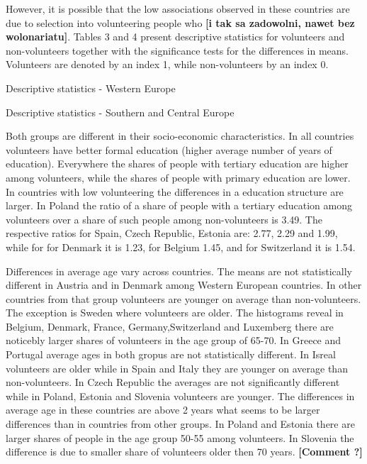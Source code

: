 \documentclass[10pt, letterpaper]{article}
\begin{document}
\begin{spacing}{1.4}
However, it is possible that the low associations observed in these countries are due to selection into volunteering people who \textbf{[i tak sa zadowolni, nawet bez wolonariatu]}. Tables 3 and 4 present descriptive statistics for volunteers and non-volunteers together with the significance tests for the differences in means. Volunteers are denoted by an index 1, while non-volunteers by an index 0.  \\


\begin{table}[H]
\begin{spacing}{.9}  
\centering 
 \caption{Descriptive statistics - Western Europe}
	 
      \label{DescT0WE} 

\end{spacing}
\end{table}


\begin{table}[H]
\begin{spacing}{.9}  
\centering 
 \caption{Descriptive statistics - Southern and Central Europe}
	 
      \label{DescT0CEE} 

\end{spacing}
\end{table}
Both groups are different in their socio-economic characteristics. In all countries volunteers have better formal education (higher average number of years of education). Everywhere the shares of people with tertiary education are higher among volunteers, while the shares of people with primary education are lower. In countries with low volunteering the differences in a education structure are larger. In Poland the ratio of a share of people with a tertiary  education among volunteers over a share of such people among non-volunteers is 3.49. The respective ratios for Spain, Czech Republic, Estonia are: 2.77, 2.29 and 1.99, while for for Denmark it is 1.23, for Belgium 1.45, and for Switzerland it is 1.54. 

Differences in average age vary across countries. The means are  not statistically different  in Austria and in Denmark among Western European countries. In other countries from that group volunteers are younger  on average than non-volunteers. The exception is Sweden where volunteers are older. The histograms reveal in Belgium, Denmark, France, Germany,Switzerland and Luxemberg there are noticebly larger shares of volunteers in the age group of 65-70. In Greece and Portugal average ages in both gropus are not statistically different. In Isreal volunteers are older while in Spain and Italy they are younger on average than non-volunteers. In Czech Republic the averages are not significantly different while in Poland, Estonia and Slovenia volunteers are younger. The differences in average age in these countries are above 2 years what seems to be larger differences than in countries from other groups. In Poland and Estonia there are larger shares of people in the age group 50-55 among volunteers.  In Slovenia the difference is due to smaller share of volunteers older then 70 years. \textbf{[Comment ?]}


\end{spacing}
\end{document}
